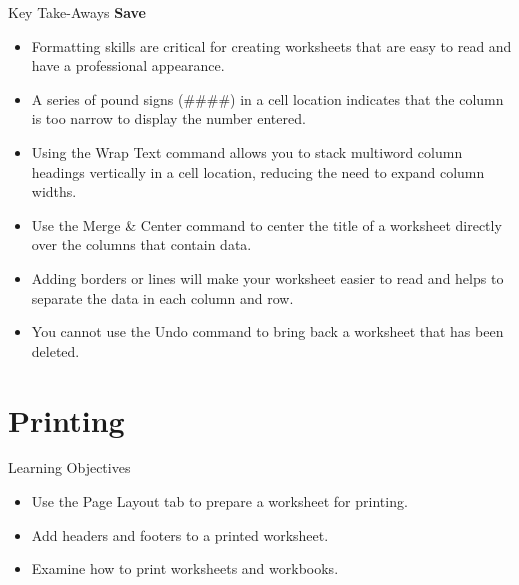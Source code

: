 \begin{center}
	\begin{tkwbox}{Key Take-Aways}
		\textbf{Save}
		\\
		\begin{itemize}
			\setlength{\itemsep}{0pt}
			\setlength{\parskip}{0pt}
			\setlength{\parsep}{0pt}
			
			\item Formatting skills are critical for creating worksheets that are easy to read and have a professional appearance.
			\item A series of pound signs (\#\#\#\#) in a cell location indicates that the column is too narrow to display the number entered.
			\item Using the Wrap Text command allows you to stack multiword column headings vertically in a cell location, reducing the need to expand column widths.
			\item Use the Merge \& Center command to center the title of a worksheet directly over the columns that contain data.
			\item Adding borders or lines will make your worksheet easier to read and helps to separate the data in each column and row.
			\item You cannot use the Undo command to bring back a worksheet that has been deleted.
		
		\end{itemize}
	\end{tkwbox}
\end{center}

\section{Printing}

\begin{center}
	\begin{objbox}{Learning Objectives}
		\begin{itemize}
			\setlength{\itemsep}{0pt}
			\setlength{\parskip}{0pt}
			\setlength{\parsep}{0pt}
			
			\item Use the Page Layout tab to prepare a worksheet for printing.
			\item Add headers and footers to a printed worksheet.
			\item Examine how to print worksheets and workbooks.
		\end{itemize}
	\end{objbox}
\end{center}

